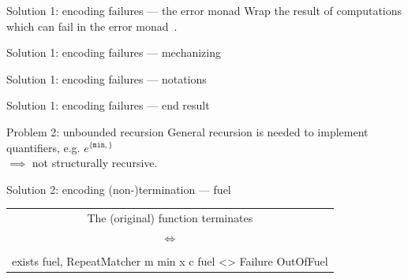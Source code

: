 \documentclass[aspectratio=169]{beamer}
\newcommand{\rrep}[2]{^{\{#1,#2\}}}
\begin{document}
    \begin{frame}{Solution 1: encoding failures --- the error monad}
        Wrap the result of computations which can fail in the error monad~\cite{monads_wadler}.
        
    \end{frame}

    \begin{frame}{Solution 1: encoding failures --- mechanizing}
        
    \end{frame}

    \begin{frame}{Solution 1: encoding failures --- notations}
        
    \end{frame}

    \begin{frame}{Solution 1: encoding failures --- end result}
        
    \end{frame}

    \begin{frame}{Problem 2: unbounded recursion}
        General recursion is needed to implement quantifiers, e.g. $e\rrep{\texttt{min}}{}$\\
        \qquad{}$\implies{}$ not structurally recursive.
        \pause{}

        
    \end{frame}

    \begin{frame}{Solution 2: encoding (non-)termination --- fuel}
        
        \pause{}
        \begin{center}\begin{tabular}{c}
            The (original) function terminates\\
            $\iff{}$\\
            \lstinline[language=Coq,basicstyle=\small]{\\exists fuel, RepeatMatcher m min x c fuel <> Failure OutOfFuel}.
        \end{tabular}\end{center}
    \end{frame}
\end{document}
